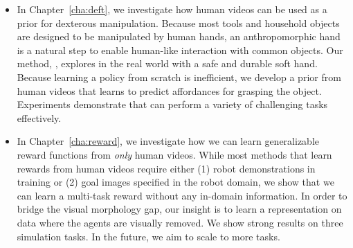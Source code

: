 \vspace{0.1in}
\begin{itemize} %
    \item In Chapter~\ref{cha:deft}, we investigate how human videos can be used as a prior for dexterous manipulation. Because most tools and household objects are designed to be manipulated by human hands, an anthropomorphic hand is a natural step to enable human-like interaction with common objects. Our method, \ours, explores in the real world with a safe and durable soft hand. Because learning a policy from scratch is inefficient, we develop a prior from human videos that learns to predict affordances for grasping the object. Experiments demonstrate that \ours can perform a variety of challenging tasks effectively.
    \item In Chapter~\ref{cha:reward}, we investigate how we can learn generalizable reward functions from \textit{only} human videos. While most methods that learn rewards from human videos require either (1) robot demonstrations in training or (2) goal images specified in the robot domain, we show that we can learn a multi-task reward without any in-domain information. In order to bridge the visual morphology gap, our insight is to learn a representation on data where the agents are visually removed. We show strong results on three simulation tasks. In the future, we aim to scale to more tasks.
\end{itemize}
